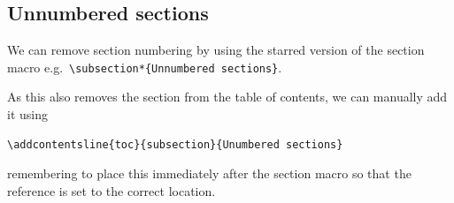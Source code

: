 \documentclass[11pt, twoside]{article}
\begin{document}
\subsection*{Unnumbered sections}
We can remove section numbering by using the starred version of the section macro
e.g.\ \lstinline|\subsection*{Unnumbered sections}|.

As this also removes the section from the table of contents, we can manually add it using
\begin{lstlisting}
\addcontentsline{toc}{subsection}{Unumbered sections}
\end{lstlisting}
remembering to place this immediately after the section macro so that the reference is set to the
correct location.
\end{document}
